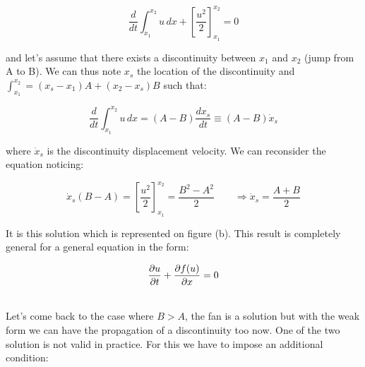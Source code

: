 \begin{equation}
\frac{d}{dt} \int _{x_1}^{x_2} u \, dx + \left[ \frac{u^2}{2}\right]_{x_1}^{x_2} = 0 
\end{equation}

and let's assume that there exists a discontinuity between $x_1$ and $x_2$ (jump from A to B). We can thus note $x_s$ the location of the discontinuity and $\int _{x_1}^{x_2} = (x_s - x_1)A + (x_2 - x_s)B$ such that: 

\begin{equation}
\frac{d}{dt} \int _{x_1}^{x_2} u \, dx = (A- B)\frac{d x_s}{dt} \equiv (A - B) \dot{x}_s
\end{equation}

where $\dot{x}_s$ is the discontinuity displacement velocity. We can reconsider the equation noticing: 

\begin{equation}
\dot{x}_s (B-A) = \left[ \frac{u^2}{2} \right]_{x_1}^{x_2} = \frac{B^2 - A^2}{2} \qquad \Rightarrow \dot{x}_s = \frac{A + B}{2}
\end{equation}

It is this solution which is represented on figure (b). This result is completely general for a general equation in the form: 

\begin{equation}
\frac{\partial u}{\partial t} + \frac{\partial f(u)}{\partial x} = 0
\end{equation}


\ \\
Let's come back to the case where $B>A$, the fan is a solution but with the weak form we can have the propagation of a discontinuity too now. One of the two solution is not valid in practice. For this we have to impose an additional condition: \\


